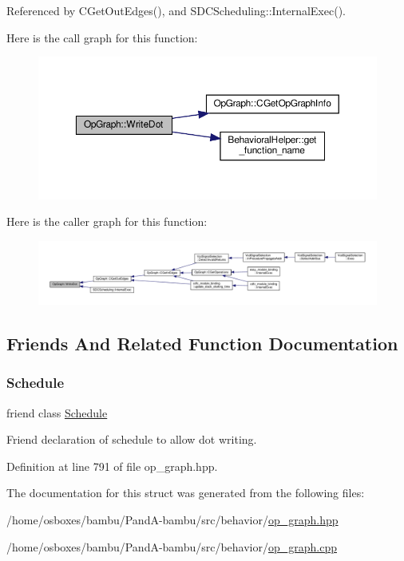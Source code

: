 Referenced by C\+Get\+Out\+Edges(), and S\+D\+C\+Scheduling\+::\+Internal\+Exec().

Here is the call graph for this function\+:
\nopagebreak
\begin{figure}[H]
\begin{center}
\leavevmode
\includegraphics[width=350pt]{d6/d79/structOpGraph_a701ba67fb9b76ca7cf399f2af98cf815_cgraph}
\end{center}
\end{figure}
Here is the caller graph for this function\+:
\nopagebreak
\begin{figure}[H]
\begin{center}
\leavevmode
\includegraphics[width=350pt]{d6/d79/structOpGraph_a701ba67fb9b76ca7cf399f2af98cf815_icgraph}
\end{center}
\end{figure}


\subsection{Friends And Related Function Documentation}
\mbox{\label{structOpGraph_aae5808dc2e987bf17ef42196457a654d}} 
\subsubsection{\texorpdfstring{Schedule}{Schedule}}
{\footnotesize\ttfamily friend class \hyperlink{classSchedule}{Schedule}\hspace{0.3cm}{\ttfamily [friend]}}



Friend declaration of schedule to allow dot writing. 



Definition at line 791 of file op\+\_\+graph.\+hpp.



The documentation for this struct was generated from the following files\+:\begin{DoxyCompactItemize}
\item 
/home/osboxes/bambu/\+Pand\+A-\/bambu/src/behavior/\hyperlink{op__graph_8hpp}{op\+\_\+graph.\+hpp}\item 
/home/osboxes/bambu/\+Pand\+A-\/bambu/src/behavior/\hyperlink{op__graph_8cpp}{op\+\_\+graph.\+cpp}\end{DoxyCompactItemize}

